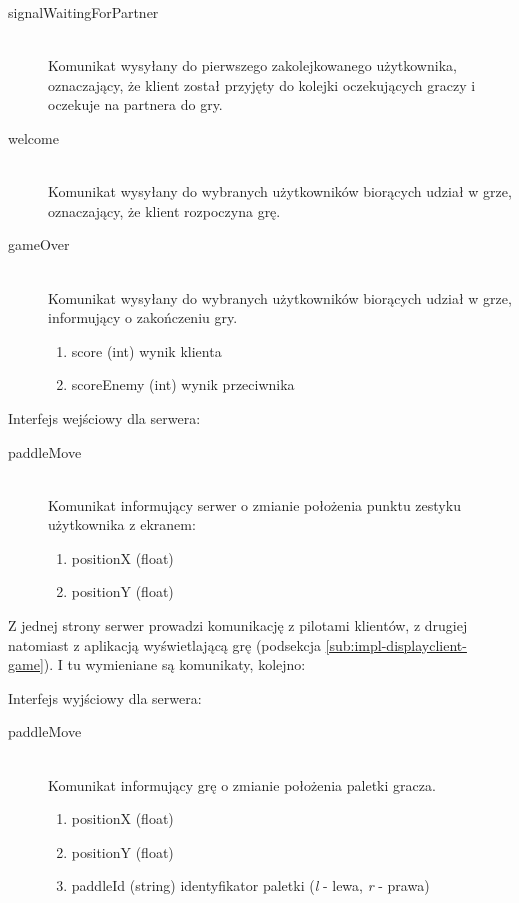 \begin{description}
	\item[signalWaitingForPartner] \hfill \\
	Komunikat wysyłany do pierwszego zakolejkowanego użytkownika, oznaczający, że klient został przyjęty do kolejki oczekujących graczy i oczekuje na partnera do gry.
\end{description}

\begin{description}
	\item[welcome] \hfill \\
	Komunikat wysyłany do wybranych użytkowników biorących udział w grze, oznaczający, że klient rozpoczyna grę.
\end{description}

\begin{description}
	\item[gameOver] \hfill \\
	Komunikat wysyłany do wybranych użytkowników biorących udział w grze, informujący o zakończeniu gry.
	\begin{enumerate}
		\item score (int) wynik klienta
		\item scoreEnemy (int) wynik przeciwnika
	\end{enumerate}
\end{description}

Interfejs wejściowy dla serwera:

\begin{description}
	\item[paddleMove] \hfill \\
	Komunikat informujący serwer o zmianie położenia punktu zestyku użytkownika z ekranem:
	\begin{enumerate}
		\item positionX (float)
		\item positionY (float)
	\end{enumerate}
\end{description}

Z jednej strony serwer prowadzi komunikację z pilotami klientów, z drugiej natomiast z aplikacją wyświetlającą grę (podsekcja \ref{sub:impl-displayclient-game}). I tu wymieniane są komunikaty, kolejno:

Interfejs wyjściowy dla serwera:

\begin{description}
	\item[paddleMove] \hfill \\
	Komunikat informujący grę o zmianie położenia paletki gracza.
	\begin{enumerate}
		\item positionX (float)
		\item positionY (float)
		\item paddleId (string) identyfikator paletki (\emph{l} - lewa, \emph{r} - prawa)
	\end{enumerate}
\end{description}

